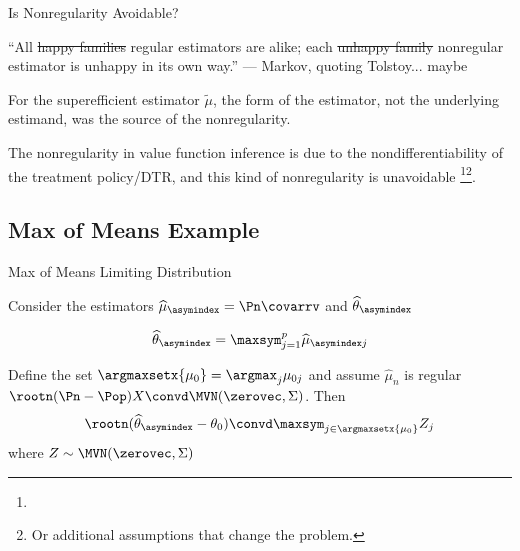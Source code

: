 \documentclass[aspectratio=169, professionalfonts, handout]{beamer}
\begin{document}
\begin{frame}{Is Nonregularity Avoidable?}

	``All \sout{happy families} regular estimators are alike; each \sout{unhappy
		family} nonregular estimator is unhappy in its own way.'' --- Markov,
	quoting Tolstoy\pause... maybe

	\vfill \pause
	For the superefficient estimator $\tilde{\mu}$, the form of the estimator, not
	the underlying estimand, was the source of the nonregularity.

	\vfill \pause

	The nonregularity in value function inference is due to the nondifferentiability of the treatment
	policy/DTR, and this kind of nonregularity is unavoidable
	\footnote<4->{}\footnote<4->{Or additional assumptions that change the problem.}.
	\vfill
\end{frame}

\subsection{Max of Means Example}
\begin{frame}{Max of Means Limiting Distribution}

	Consider the estimators $\widehat{\mu}_{\asymindex} = \Pn \covarrv$  and $\widehat{\theta}_{\asymindex}$

	$$\widehat{\theta}_{\asymindex} = \maxsym_{j = 1}^p \widehat{\mu}_{\asymindex j}$$

	\begin{lemma}
		Define the set $\argmaxsetx{\mu_{0}} = \argmax_j \mu_{0j}$ and assume
		$\widehat{\mu}_n$ is regular $\rootn (\Pn - \Pop)X \convd \MVN(\zerovec, \Sigma)$. Then
		\begin{displaymath}
			\rootn (\widehat{\theta}_{\asymindex} - \theta_0) \convd \maxsym_{j \in \argmaxsetx{\mu_0}} Z_j
		\end{displaymath}
		where $Z \sim \MVN(\zerovec, \Sigma)$
	\end{lemma}

\end{frame}
\end{document}
